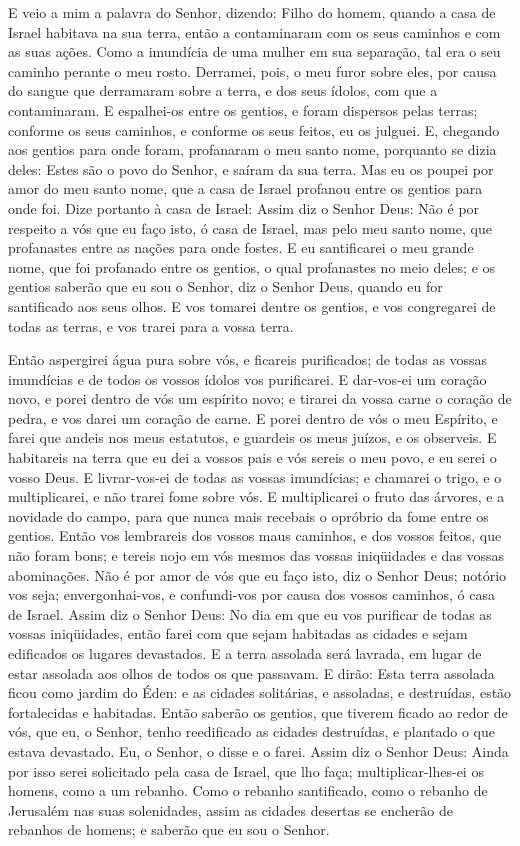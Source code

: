 E veio a mim a palavra do Senhor, dizendo: Filho do homem,
quando a casa de Israel habitava na sua terra, então a contaminaram
com os seus caminhos e com as suas ações. Como a imundícia de uma
mulher em sua separação, tal era o seu caminho perante o meu rosto.
Derramei, pois, o meu furor sobre eles, por causa do sangue
que derramaram sobre a terra, e dos seus ídolos, com que a
contaminaram. E espalhei-os entre os gentios, e foram
dispersos pelas terras; conforme os seus caminhos, e conforme os
seus feitos, eu os julguei. E, chegando aos gentios para onde
foram, profanaram o meu santo nome, porquanto se dizia deles: Estes
são o povo do Senhor, e saíram da sua terra. Mas eu os poupei
por amor do meu santo nome, que a casa de Israel profanou entre os
gentios para onde foi. Dize portanto à casa de Israel: Assim
diz o Senhor Deus: Não é por respeito a vós que eu faço isto, ó casa
de Israel, mas pelo meu santo nome, que profanastes entre as nações
para onde fostes. E eu santificarei o meu grande nome, que
foi profanado entre os gentios, o qual profanastes no meio deles; e
os gentios saberão que eu sou o Senhor, diz o Senhor Deus, quando eu
for santificado aos seus olhos. E vos tomarei dentre os
gentios, e vos congregarei de todas as terras, e vos trarei para a
vossa terra.

Então aspergirei água pura sobre vós, e ficareis purificados; de
todas as vossas imundícias e de todos os vossos ídolos vos
purificarei. E dar-vos-ei um coração novo, e porei dentro de
vós um espírito novo; e tirarei da vossa carne o coração de pedra, e
vos darei um coração de carne. E porei dentro de vós o meu
Espírito, e farei que andeis nos meus estatutos, e guardeis os meus
juízos, e os observeis. E habitareis na terra que eu dei a
vossos pais e vós sereis o meu povo, e eu serei o vosso Deus.
E livrar-vos-ei de todas as vossas imundícias; e chamarei o
trigo, e o multiplicarei, e não trarei fome sobre vós. E
multiplicarei o fruto das árvores, e a novidade do campo, para que
nunca mais recebais o opróbrio da fome entre os gentios.
Então vos lembrareis dos vossos maus caminhos, e dos vossos
feitos, que não foram bons; e tereis nojo em vós mesmos das vossas
iniqüidades e das vossas abominações. Não é por amor de vós
que eu faço isto, diz o Senhor Deus; notório vos seja;
envergonhai-vos, e confundi-vos por causa dos vossos caminhos, ó
casa de Israel. Assim diz o Senhor Deus: No dia em que eu vos
purificar de todas as vossas iniqüidades, então farei com que sejam
habitadas as cidades e sejam edificados os lugares devastados.
E a terra assolada será lavrada, em lugar de estar assolada
aos olhos de todos os que passavam. E dirão: Esta terra
assolada ficou como jardim do Éden: e as cidades solitárias, e
assoladas, e destruídas, estão fortalecidas e habitadas.
Então saberão os gentios, que tiverem ficado ao redor de vós,
que eu, o Senhor, tenho reedificado as cidades destruídas, e
plantado o que estava devastado. Eu, o Senhor, o disse e o farei.
Assim diz o Senhor Deus: Ainda por isso serei solicitado pela
casa de Israel, que lho faça; multiplicar-lhes-ei os homens, como a
um rebanho. Como o rebanho santificado, como o rebanho de
Jerusalém nas suas solenidades, assim as cidades desertas se
encherão de rebanhos de homens; e saberão que eu sou o Senhor.

